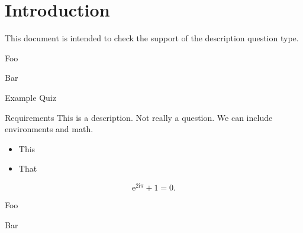 \documentclass{article}
\begin{document}
\section*{Introduction}

This document is intended to check the support of the description 
question type.

\begin{description}
\item Foo
\item Bar
\end{description}

\begin{quiz}{Example Quiz}
\begin{description}[tags={descr},feedback={here is a feedback}]{Requirements}
This is a description. Not really a question. We can include environments and 
math. 
\begin{itemize}
\item This
\item That
\end{itemize}
\[\mathrm{e}^{2\mathrm{i}\pi}+1=0.\]
\end{description}
\end{quiz}

\begin{description}
\item Foo
\item Bar
\end{description}
\end{document}
